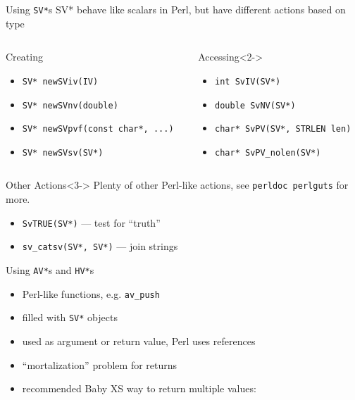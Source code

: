 \documentclass{beamer}
\providecommand{\code}[1]{{\texttt{\scriptsize{#1}}}}
\begin{document}
\begin{frame}{Using \texttt{SV*}s}
  SV* behave like scalars in Perl, but have different actions based on type
  \begin{columns}
    \begin{column}{0.49\linewidth}
      \begin{block}{Creating}
        \begin{itemize}
          \item \code{SV* newSViv(IV)}
          \item \code{SV* newSVnv(double)}
          \item \code{SV* newSVpvf(const char*, ...)}
          \item \code{SV* newSVsv(SV*)}
        \end{itemize}
      \end{block}
    \end{column}
    \begin{column}{0.49\linewidth}
      \begin{block}{Accessing}<2->
        \begin{itemize}
          \item \code{int SvIV(SV*)}
          \item \code{double SvNV(SV*)}
          \item \code{char* SvPV(SV*, STRLEN len)}
          \item \code{char* SvPV\_nolen(SV*)}
        \end{itemize}
      \end{block}
    \end{column}
  \end{columns}
  \begin{block}{Other Actions}<3->
    Plenty of other Perl-like actions, see \code{perldoc perlguts} for more.
    \begin{itemize}
      \item \code{SvTRUE(SV*)} --- test for ``truth''
      \item \code{sv\_catsv(SV*, SV*)} --- join strings
    \end{itemize}
  \end{block}
\end{frame}

\begin{frame}[fragile]{Using \texttt{AV*}s and \texttt{HV*}s}
  \begin{itemize}
    \item Perl-like functions, e.g. \code{av\_push}
    \item filled with \code{SV*} objects
    \item used as argument or return value, Perl uses references
    \item ``mortalization'' problem for returns
    \item recommended Baby XS way to return multiple values:
  \end{itemize}
  \vfill
  \begin{block}{}
    \scriptsize
    
  \end{block}
\end{frame}
\end{document}
